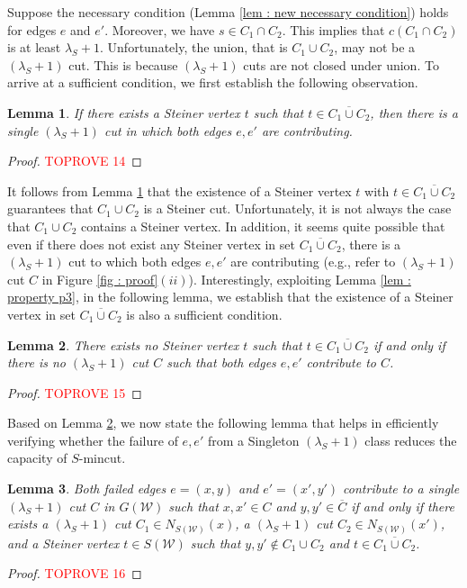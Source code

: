 \documentclass[letterpaper,11pt]{article}
\newtheorem{lemma}{Lemma}[]
\begin{document}
Suppose the necessary condition (Lemma \ref{lem : new necessary condition}) holds for edges $e$ and $e'$. Moreover, we have $s\in C_1\cap C_2$. This implies that $c(C_1\cap C_2)$ is at least $\lambda_S+1$. Unfortunately, the union, that is $C_1\cup C_2$, may not be a $(\lambda_S+1)$ cut. This is because $(\lambda_S+1)$ cuts are not closed under union.
To arrive at a sufficient condition, we first establish the following observation.
\begin{lemma} \label{lem : existence of a steiner vertex}
    If there exists a Steiner vertex $t$ such that $t\in \overline{C_1\cup C_2}$, then there is a single $(\lambda_S+1)$ cut in which both edges $e,e'$ are contributing. 
\end{lemma}
\begin{proof}\textcolor{red}{TOPROVE 14}\end{proof}
It follows from Lemma \ref{lem : existence of a steiner vertex} that the existence of a Steiner vertex $t$ with $t\in \overline{C_1 \cup C_2}$ guarantees that $C_1\cup C_2$ is a Steiner cut. Unfortunately, it is not always the case that $C_1\cup C_2$ contains a Steiner vertex. In addition, it seems quite possible that even if there does not exist any Steiner vertex in set $\overline{C_1\cup C_2}$, there is a $(\lambda_S+1)$ cut to which both edges $e,e'$ are contributing (e.g., refer to $(\lambda_S+1)$ cut $C$ in Figure \ref{fig : proof}$(ii)$). Interestingly, exploiting Lemma \ref{lem : property p3}, in the following lemma, we establish that the existence of a Steiner vertex in set $\overline{C_1\cup C_2}$ is also a sufficient condition.  

\begin{lemma} \label{lem : sufficient condition}
    There exists no Steiner vertex $t$ such that $t\in \overline{C_1\cup C_2}$ if and only if there is no $(\lambda_S+1)$ cut $C$ such that both edges $e,e'$ contribute to $C$.
\end{lemma}
\begin{proof}\textcolor{red}{TOPROVE 15}\end{proof}
Based on Lemma \ref{lem : sufficient condition}, we now state the following lemma that helps in efficiently verifying whether the failure of $e,e'$ from a Singleton $(\lambda_S+1)$ class reduces the capacity of $S$-mincut. 
\begin{lemma} \label{lem : condition of dual failure}
    Both failed edges $e=(x,y)$ and $e'=(x',y')$ contribute to a single $(\lambda_S+1)$ cut $C$ in $G({\mathcal W})$ such that $x,x'\in C$ and $y,y'\in \overline{C}$ if and only if there exists a $(\lambda_S+1)$ cut $C_1\in N_{S({\mathcal W})}(x)$, a $(\lambda_S+1)$ cut $C_2\in N_{S({\mathcal W})}(x')$, and a Steiner vertex $t\in S({\mathcal W})$ such that $y,y'\notin C_1 \cup C_2$ and $t\in \overline{C_1 \cup C_2}$.
\end{lemma}
\begin{proof}\textcolor{red}{TOPROVE 16}\end{proof}
\end{document}

